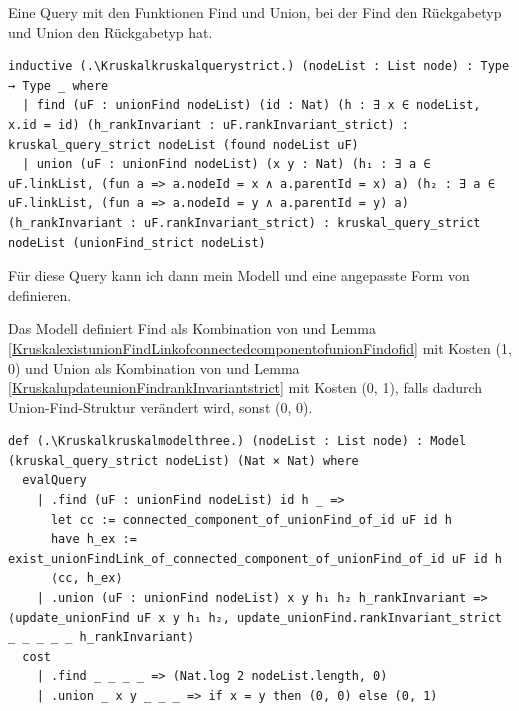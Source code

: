 \begin{definition}[\Kruskalkruskalquerystrict]
  Eine Query mit den Funktionen Find und Union, bei der Find den Rückgabetyp \Kruskalfound und Union den Rückgabetyp \KruskalunionFindstrict hat.
\end{definition}
\begin{lstlisting}
inductive (.\Kruskalkruskalquerystrict.) (nodeList : List node) : Type → Type _ where
  | find (uF : unionFind nodeList) (id : Nat) (h : ∃ x ∈ nodeList, x.id = id) (h_rankInvariant : uF.rankInvariant_strict) : kruskal_query_strict nodeList (found nodeList uF)
  | union (uF : unionFind nodeList) (x y : Nat) (h₁ : ∃ a ∈ uF.linkList, (fun a => a.nodeId = x ∧ a.parentId = x) a) (h₂ : ∃ a ∈ uF.linkList, (fun a => a.nodeId = y ∧ a.parentId = y) a) (h_rankInvariant : uF.rankInvariant_strict) : kruskal_query_strict nodeList (unionFind_strict nodeList)
\end{lstlisting}

Für diese Query kann ich dann mein Modell und eine angepasste Form von \Kruskalkruskalprog definieren.

\begin{definition}[\Kruskalkruskalmodelthree]
  Das Modell definiert Find als Kombination von \KruskalconnectedcomponentofunionFindofid und Lemma \ref{KruskalexistunionFindLinkofconnectedcomponentofunionFindofid} mit Kosten (1, 0)
  und Union als Kombination von \KruskalupdateunionFind und Lemma \ref{KruskalupdateunionFindrankInvariantstrict} mit Kosten (0, 1), falls dadurch Union-Find-Struktur verändert wird, sonst (0, 0).
\end{definition}
\begin{lstlisting}
def (.\Kruskalkruskalmodelthree.) (nodeList : List node) : Model (kruskal_query_strict nodeList) (Nat × Nat) where
  evalQuery
    | .find (uF : unionFind nodeList) id h _ =>
      let cc := connected_component_of_unionFind_of_id uF id h
      have h_ex := exist_unionFindLink_of_connected_component_of_unionFind_of_id uF id h
      ⟨cc, h_ex⟩
    | .union (uF : unionFind nodeList) x y h₁ h₂ h_rankInvariant => ⟨update_unionFind uF x y h₁ h₂, update_unionFind.rankInvariant_strict _ _ _ _ _ h_rankInvariant⟩
  cost
    | .find _ _ _ _ => (Nat.log 2 nodeList.length, 0)
    | .union _ x y _ _ _ => if x = y then (0, 0) else (0, 1)
\end{lstlisting}




